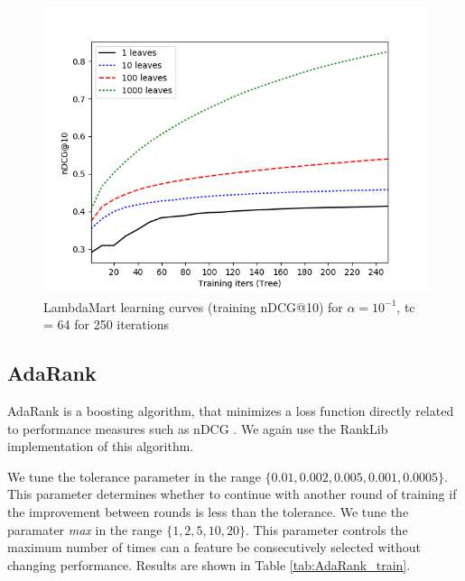 \documentclass[english]{article}
\theoremstyle{definition}
\begin{document}
\begin{multicols}{2}
\begin{figure}[H]
\includegraphics[width=\linewidth]{figures/LambdaMART_64_training.png}
\caption{LambdaMart learning curves (training nDCG@10) for $\alpha=10^{-1}$, tc = 64 for 250 iterations } \label{fig:LambdaMART_lc}
\label{LambdaMART_lc}
\end{figure}

\subsection{AdaRank}

AdaRank is a boosting algorithm, that minimizes a loss function directly related to performance measures such as nDCG \cite{Xu2007AdaRankAB}.  We again use the RankLib implementation of this algorithm.  

We tune the tolerance parameter in the range $\{0.01, 0.002, 0.005, 0.001, 0.0005\}$.  This parameter determines whether to continue with another round of training if the improvement between rounds is less than the tolerance.  We tune the paramater \emph{max} in the range $\{1, 2, 5, 10, 20\}$.  This parameter controls the maximum number of times can a feature be consecutively selected without changing performance.
Results are shown in Table \ref{tab:AdaRank_train}.


\end{multicols}
\end{document}
